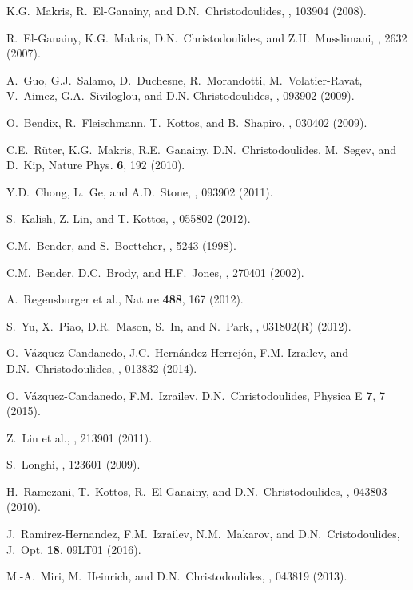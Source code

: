 \documentclass[aps,pra,reprint,showpacs,bibnotes,preprintnumbers,twoside,eqsecnum]{revtex4-1}
\begin{document}
\begin{thebibliography}{99}

K.G.~Makris, R.~El-Ganainy, and D.N.~Christodoulides, , 103904 (2008).

R.~El-Ganainy, K.G.~Makris, D.N.~Christodoulides, and Z.H.~Musslimani, , 2632 (2007).

A.~Guo, G.J.~Salamo, D.~Duchesne, R.~Morandotti, M.~Volatier-Ravat, V.~Aimez, G.A.~Siviloglou, and D.N. Christodoulides, , 093902 (2009).

O.~Bendix, R.~Fleischmann, T.~Kottos, and B.~Shapiro, , 030402 (2009).

C.E.~Rüter, K.G.~Makris, R.E.~Ganainy, D.N.~Christodou\-lides, M.~Segev, and D.~Kip, Nature Phys. {\bf 6}, 192 (2010).

Y.D.~Chong, L.~Ge, and A.D.~Stone, , 093902 (2011).

S.~Kalish, Z. Lin, and T. Kottos, , 055802 (2012).

C.M.~Bender, and S.~Boettcher, , 5243 (1998).

C.M.~Bender, D.C.~Brody, and H.F.~Jones, , 270401 (2002).

A.~Regensburger et al., Nature {\bf 488}, 167 (2012).

S.~Yu, X.~Piao, D.R.~Mason, S.~In, and N.~Park, , 031802(R) (2012).

O.~V\'azquez-Candanedo, J.C.~Hern\'andez-Herrej\'on, F.M. Izrailev, and D.N.~Christodoulides, , 013832 (2014).

O.~V\'azquez-Candanedo,  F.M.~Izrailev, D.N.~Christodou\-lides, Physica E {\bf 7}, 7 (2015).

Z.~Lin et al., , 213901 (2011).

S.~Longhi, , 123601 (2009).

H.~Ramezani, T.~Kottos, R.~El-Ganainy, and D.N.~Chris\-todoulides, , 043803 (2010).

J.~Ramirez-Hernandez, F.M.~Izrailev, N.M.~Makarov, and D.N.~Cristodoulides, J.~Opt. {\bf 18}, 09LT01 (2016).

M.-A.~Miri, M.~Heinrich, and D.N.~Christodoulides, , 043819 (2013).


\end{thebibliography}
\end{document}
